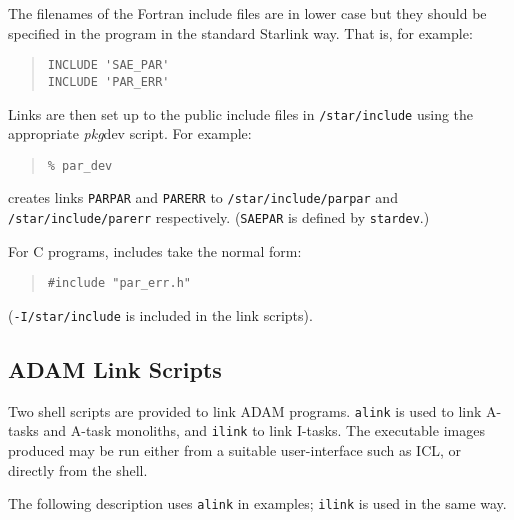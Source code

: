 \documentclass[twoside,11pt]{article}
\newcommand{\htmlref}[2]{#1}
\newcommand{\xref}[3]{#1}
\newcommand{\xlabel}[1]{}
\renewcommand{\_}{\texttt{\symbol{95}}}
\begin{document}
The filenames of the Fortran include files are in lower case but they should 
be specified in the program in the standard Starlink way. That is, for example:
\begin{quote} \begin{verbatim}
INCLUDE 'SAE_PAR'
INCLUDE 'PAR_ERR'
\end{verbatim} \end{quote}
Links are then set up to the public include files in \texttt{/star/include}
using the appropriate \textit{pkg}\_dev script. 
For example:
\begin{quote} \begin{verbatim}
% par_dev
\end{verbatim} \end{quote}
creates links \texttt{PAR\_PAR} and \texttt{PAR\_ERR} to 
\texttt{/star/include/par\_par} and \texttt{/star/include/par\_err} 
respectively.
(\texttt{SAE\_PAR} is defined by \texttt{star\_dev}.)

For C programs, includes take the normal form:
\begin{quote} \begin{verbatim}
#include "par_err.h"
\end{verbatim} \end{quote}
(\texttt{-I/star/include} is included in the 
\htmlref{link scripts}{link_scripts}).

\subsection{\xlabel{ADAM_link_scripts}\xlabel{adam_link_scripts}
\label{link_scripts}ADAM Link Scripts}
Two shell scripts are provided to link ADAM programs.
\texttt{alink} is used to link A-tasks and A-task monoliths, and 
\texttt{ilink} to link I-tasks.
The executable images produced may be run either from a suitable user-interface
such as 
\xref{ICL}{sg5}{abstract},
or directly from the shell. 

The following description uses \texttt{alink} in examples; \texttt{ilink} is 
used in the same way.
\end{document}
